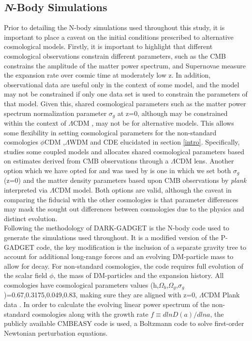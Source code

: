 \documentclass[a4paper,fleqn,usenatbib]{mnras}
\def \lcdm{$\Lambda$CDM }
\def \lwdm{$\Lambda$WDM }
\def \qcdm{$\phi$CDM }
\begin{document}
\subsection{\textit{N}-Body Simulations}\label{nbodysim}
Prior to detailing the N-body simulations used throughout this study, it is important to place a caveat on the initial conditions prescribed to alternative cosmological models. Firstly, it is important to highlight that different cosmological observations constrain different parameters, such as the CMB constrains the amplitude of the matter power spectrum, and Supernovae measure the expansion rate over cosmic time at moderately low z. In addition, observational data are useful only in the context of some model, and the model may not be constrained if only one data set is used to constrain the parameters of that model. Given this, shared cosmological parameters such as the matter power spectrum normalization parameter $\sigma_g$ at z=0, although may be constrained within the context of \lcdm, may not be for alternative models. This allows some flexibility in setting cosmological parameters for the non-standard cosmologies \qcdm,\lwdm and CDE elucidated in section \ref{intro}. Specifically, \citet{Baldi_12} studies some coupled models and allocates shared cosmological parameters based on estimates derived from CMB observations through a \lcdm lens. Another option which we have opted for and was used by \citet{Carlesi_14a} is one in which we set both $\sigma_g$(z=0) and the matter density parameters based upon CMB observations by \textit{plank} interpreted via \lcdm model. Both options are valid, although the caveat in comparing the fiducial with the other cosmologies is that parameter differences may mask the sought out differences between cosmologies due to the physics and distinct evolution. 
\\
Following the methodology of \citep{Elahi_15} DARK-GADGET is the N-body code used to generate the simulations used throughout. It is a modified version of the P-GADGET code, the key modification is the inclusion of a separate gravity tree to account for additional long-range forces and an evolving DM-particle mass to allow for decay. For non-standard cosmologies, the code requires full evolution of the scalar field $\phi$, the mass of DM-particles and the expansion history. All cosmologies have cosmological parameters values (h,$\Omega_{b}$,$\Omega_{g}$,$\sigma_{g}$)=0.67,0.3175,0.049,0.83, making sure they are aligned with z=0, \lcdm Plank data \citep{Plank_14b,Plank_16}. In order to calculate the evolving linear power spectrum of the non-standard cosmologies along with the growth rate $\textit{f}\equiv dln D(a)/dln \textit{a} $, the publicly available CMBEASY \citep{Doran_05} code is used, a Boltzmann code to solve first-order Newtonian perturbation equations. 
\end{document}
